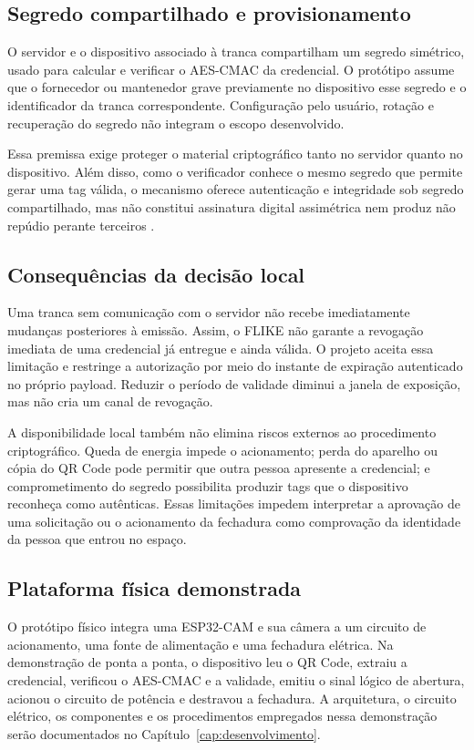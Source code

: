 \subsection{Segredo compartilhado e provisionamento}

O servidor e o dispositivo associado à tranca compartilham um segredo simétrico, usado para calcular e verificar o AES-CMAC da credencial. O protótipo assume que o fornecedor ou mantenedor grave previamente no dispositivo esse segredo e o identificador da tranca correspondente. Configuração pelo usuário, rotação e recuperação do segredo não integram o escopo desenvolvido.

Essa premissa exige proteger o material criptográfico tanto no servidor quanto no dispositivo. Além disso, como o verificador conhece o mesmo segredo que permite gerar uma tag válida, o mecanismo oferece autenticação e integridade sob segredo compartilhado, mas não constitui assinatura digital assimétrica nem produz não repúdio perante terceiros \cite{nist2005cmac,barker2020keymanagement}.

\subsection{Consequências da decisão local}

Uma tranca sem comunicação com o servidor não recebe imediatamente mudanças posteriores à emissão. Assim, o FLIKE não garante a revogação imediata de uma credencial já entregue e ainda válida. O projeto aceita essa limitação e restringe a autorização por meio do instante de expiração autenticado no próprio payload. Reduzir o período de validade diminui a janela de exposição, mas não cria um canal de revogação.

A disponibilidade local também não elimina riscos externos ao procedimento criptográfico. Queda de energia impede o acionamento; perda do aparelho ou cópia do QR Code pode permitir que outra pessoa apresente a credencial; e comprometimento do segredo possibilita produzir tags que o dispositivo reconheça como autênticas. Essas limitações impedem interpretar a aprovação de uma solicitação ou o acionamento da fechadura como comprovação da identidade da pessoa que entrou no espaço.

\subsection{Plataforma física demonstrada}

O protótipo físico integra uma ESP32-CAM e sua câmera a um circuito de acionamento, uma fonte de alimentação e uma fechadura elétrica. Na demonstração de ponta a ponta, o dispositivo leu o QR Code, extraiu a credencial, verificou o AES-CMAC e a validade, emitiu o sinal lógico de abertura, acionou o circuito de potência e destravou a fechadura. A arquitetura, o circuito elétrico, os componentes e os procedimentos empregados nessa demonstração serão documentados no Capítulo~\ref{cap:desenvolvimento}.

